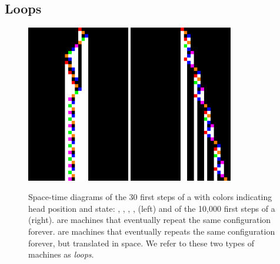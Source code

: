 
\newpage
\subsection{Loops}\label{sec:loops}

\begin{figure}[h!]
  \centering
  \includegraphics[width=0.4\textwidth]{figures/space-time-diagrams/cycler_279081.pdf}
  \hspace{2ex}
  \includegraphics[width=0.4\textwidth]{figures/space-time-diagrams/translated_cycler_62645534.pdf}
  \caption{Space-time diagrams of the 30 first steps of a \textit{\cycler}\protect\footnotemark  with colors indicating head position and state: \stateA, \stateB, \stateC, \stateD, \stateE (left) and of the 10,000 first steps of a \textit{\TC}\protect\footnotemark (right). \cyclers are machines that eventually repeat the same configuration forever. \TCs are machines that eventually repeats the same configuration forever, but translated in space. We refer to these two types of machines as \textit{loops}.}\label{fig:loops}
\end{figure}

